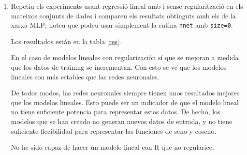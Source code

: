 \documentclass[a4paper]{article}
\begin{document}
\begin{enumerate}
        \item Repetiu els experiments usant regressió lineal amb i sense regularització en els mateixos conjunts
        de dades i compareu els resultats obtinguts amb els de la xarxa MLP; noteu que podeu usar
        simplement la rutina
        \texttt{nnet}
        amb
        \texttt{size=0}.

        {\bfseries

        Los resultados están en la tabla \ref{res}.

        En el caso de modelos lineales con regularización sí que se mejoran a medida que los datos de training se incrementan. Con esto se ve que los modelos lineales son más estables que las redes neuronales.

        De todos modos, las redes neuronales siempre tienen unos resultados mejores que los modelos lineales. Esto puede ser un indicador de que el modelo lineal no tiene suficiente potencia para representar estos datos. De hecho, los modelos que se han creado no generan nuevos datos de entrada, y no tiene suficiente flecibilidad para representar las funciones de seno y coseno.


        No he sido capaz de hacer un modelo lineal con R que no regularice.
        }
    \end{enumerate}
\end{document}
